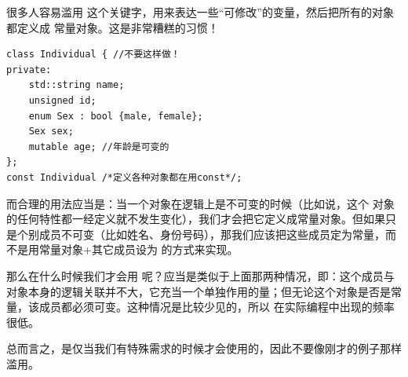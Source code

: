 很多人容易滥用 \lstinline@mutable@ 这个关键字，用来表达一些``可修改''的变量，然后把所有的对象都定义成 \lstinline@const@ 常量对象。这是非常糟糕的习惯！\par
\begin{lstlisting}
class Individual { //不要这样做！
private:
    std::string name;
    unsigned id;
    enum Sex : bool {male, female};
    Sex sex;
    mutable age; //年龄是可变的
};
const Individual /*定义各种对象都在用const*/;
\end{lstlisting}\par
而合理的用法应当是：当一个对象在逻辑上是不可变的时候（比如说，这个 \lstinline@Individual@ 对象的任何特性都一经定义就不发生变化），我们才会把它定义成常量对象。但如果只是个别成员不可变（比如姓名、身份号码），那我们应该把这些成员定为常量，而不是用常量对象+其它成员设为 \lstinline@mutable@ 的方式来实现。\par
那么在什么时候我们才会用 \lstinline@mutable@ 呢？应当是类似于上面那两种情况，即：这个成员与对象本身的逻辑关联并不大，它充当一个单独作用的量；但无论这个对象是否是常量，该成员都必须可变。这种情况是比较少见的，所以 \lstinline@mutable@ 在实际编程中出现的频率很低。\par
总而言之，\lstinline@mutable@ 是仅当我们有特殊需求的时候才会使用的，因此不要像刚才的例子那样滥用。\par
